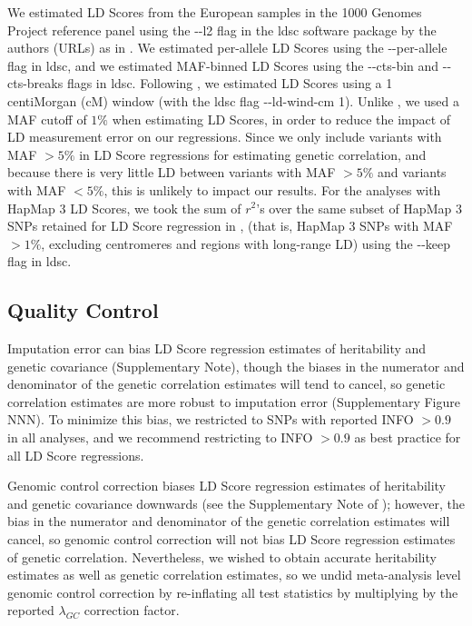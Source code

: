 \documentclass[11pt]{article}
\numberwithin{equation}{section}
\begin{document}
We estimated LD Scores from the European samples in the 1000 Genomes Project \cite{10002012integrated}
reference panel using the {-}{-}l2 flag in the ldsc software package by the authors (URLs) as in \cite{buliksullivan2014}.
We estimated per-allele LD Scores using the {-}{-}per-allele flag in ldsc, and
we estimated MAF-binned LD Scores using the {-}{-}cts-bin and {-}{-}cts-breaks flags in ldsc.
Following \cite{buliksullivan2014}, we estimated LD Scores using a 1 centiMorgan (cM) window
(with the ldsc flag {-}{-}ld-wind-cm 1).
Unlike \cite{buliksullivan2014}, we used a MAF cutoff of $1\%$ when estimating LD Scores,
in order to reduce the impact of LD measurement error on our regressions.
Since we only include variants with MAF $> 5\%$ in LD Score regressions for estimating genetic correlation,
and because there is very little LD between variants with MAF $> 5\%$ and variants with MAF $< 5\%$, 
this is unlikely to impact our results. For the analyses with HapMap 3 \cite{international2010integrating} LD Scores,
we took the sum of $r^2$'s over the same subset of HapMap 3 SNPs retained for LD Score regression in
\cite{buliksullivan2014}, (that is, HapMap 3 SNPs with MAF $> 1\%$, excluding centromeres and regions with long-range LD)
using the {-}{-}keep flag in ldsc.

\subsection{Quality Control}

Imputation error can bias LD Score regression estimates of heritability and genetic covariance (Supplementary Note), though the biases in the numerator and denominator of the genetic correlation estimates will tend to cancel, so genetic correlation estimates are more robust to imputation error (Supplementary Figure NNN). To minimize this bias, we restricted to SNPs with reported INFO $> 0.9$ in all analyses, and we recommend restricting to INFO $>0.9$ as best practice for all LD Score regressions.

Genomic control correction biases LD Score regression estimates of heritability and genetic covariance downwards
(see the Supplementary Note of \cite{buliksullivan2014});
however, the bias in the numerator and denominator of the genetic correlation estimates will cancel, 
so genomic control correction will not bias LD Score regression estimates of genetic correlation.
Nevertheless, we wished to obtain accurate heritability estimates as well as genetic correlation estimates,
so we undid meta-analysis level genomic control correction by re-inflating all test statistics by multiplying by the reported 
$\lambda_{GC}$ correction factor.
\end{document}
